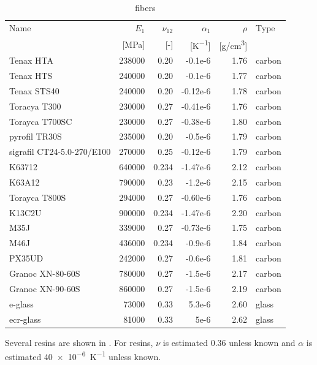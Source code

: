 \documentclass[a4paper,landscape,oneside,11pt,twocolumn]{memoir}
\begin{document}
\begin{table}[!htbp]
  \centering
  \caption{\label{tb:fibers}fibers}
  \begin{tabular}{lrrrrl}%
      Name & $E_1$ & $\nu_{12}$ & $\alpha_1$ & $\rho$ & Type\\
      & [\si{MPa}] & [-] & [\si{K^{-1}}] & [\si{g/cm^3}]\\
    \midrule
      Tenax HTA & 238000 & 0.20 & -0.1e-6 & 1.76 & carbon\\
Tenax HTS & 240000 & 0.20 & -0.1e-6 & 1.77 & carbon\\
Tenax STS40 & 240000 & 0.20 & -0.12e-6 & 1.78 & carbon\\
Toracya T300 & 230000 & 0.27 & -0.41e-6 & 1.76 & carbon\\
Torayca T700SC & 230000 & 0.27 & -0.38e-6 & 1.80 & carbon\\
pyrofil TR30S & 235000 & 0.20 & -0.5e-6 & 1.79 & carbon\\
sigrafil CT24-5.0-270/E100 & 270000 & 0.25 & -0.12e-6 & 1.79 & carbon\\
K63712 & 640000 & 0.234 & -1.47e-6 & 2.12 & carbon\\
K63A12 & 790000 & 0.23 & -1.2e-6 & 2.15 & carbon\\
Torayca T800S & 294000 & 0.27 & -0.60e-6 & 1.76 & carbon\\
K13C2U & 900000 & 0.234 & -1.47e-6 & 2.20 & carbon\\
M35J & 339000 & 0.27 & -0.73e-6 & 1.75 & carbon\\
M46J & 436000 & 0.234 & -0.9e-6 & 1.84 & carbon\\
PX35UD & 242000 & 0.27 & -0.6e-6 & 1.81 & carbon\\
Granoc XN-80-60S & 780000 & 0.27 & -1.5e-6 & 2.17 & carbon\\
Granoc XN-90-60S & 860000 & 0.27 & -1.5e-6 & 2.19 & carbon\\
e-glass & 73000 & 0.33 & 5.3e-6 & 2.60 & glass\\
ecr-glass & 81000 & 0.33 & 5e-6 & 2.62 & glass\\
  \end{tabular}
\end{table}

Several resins are shown in . For resins, $\nu$ is estimated
0.36 unless known and $\alpha$ is estimated \SI{40e-6}{K^{-1}} unless known.
\end{document}
